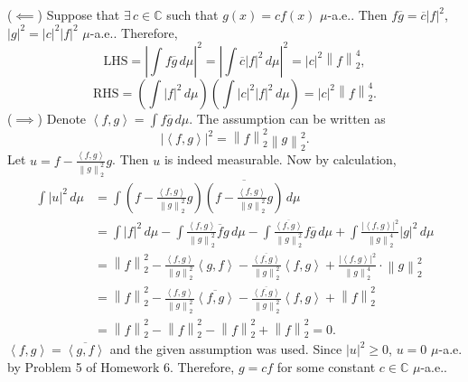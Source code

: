 \documentclass[12pt]{report}
\newcommand{\norm}[1]{\left\lVert #1 \right\rVert}
\newcommand{\abs}[1]{\left| #1 \right|}
\newcommand{\paren}[1]{\left( #1 \right)}
\renewcommand{\span}[1]{\left\langle #1 \right\rangle}
\newcommand{\mimp}{\(\implies\)}
\newcommand{\mimpd}{\(\impliedby\)}
\newcommand{\C}{\mathbb{C}}
\renewcommand{\d}[1]{\,d{#1}}
\let\oldexists\exists
\renewcommand{\exists}{\oldexists\,}
\begin{document}
\begin{enumerate}
    (\mimpd) Suppose that \(\exists c \in \C\) such that \(g(x) = cf(x)\) \(\mu\)-a.e.. Then \(f \overline{g} = \overline{c} \abs{f}^2\), \(\abs{g}^2 = \abs{c}^2 \abs{f}^2\) \(\mu\)-a.e.. Therefore,
    \[
        \text{LHS} = \abs{\int f\overline{g} \d{\mu}}^2 =\abs{\int \overline{c} \abs{f}^2 \d{\mu}}^2 = \abs{c}^2 \norm{f}_2^4,
    \]
    \[
        \text{RHS} = \paren{\int \abs{f}^2 \d{\mu}} \paren{\int \abs{c}^2 \abs{f}^2 \d{\mu}} = \abs{c}^2 \norm{f}_2^4.
    \]
    (\mimp) Denote \(\span{f, g} = \int f\overline{g} \d{\mu}\). The assumption can be written as
    \[
        \abs{\span{f, g}}^2 = \norm{f}_2^2 \norm{g}_2^2.
    \]
    Let \(u = f - \frac{\span{f, g}}{\norm{g}_2^2}g\). Then \(u\) is indeed measurable. Now by calculation,
    \[
        \begin{aligned}
            \int \abs{u}^2 \d{\mu} & = \int \paren{f - \frac{\span{f, g}}{\norm{g}_2^2}g} \overline{\paren{f - \frac{\span{f, g}}{\norm{g}_2^2}g}} \d{\mu}                                                                                                            \\
                                   & = \int \abs{f}^2 \d{\mu} - \int \frac{\span{f, g}}{\norm{g}_2^2} \overline{f} g \d{\mu} - \int \frac{\overline{\span{f, g}}}{\norm{g}_2^2}f\overline{g}\d{\mu} + \int \frac{\abs{\span{f, g}}^2}{\norm{g}_2^4} \abs{g}^2 \d{\mu} \\
                                   & = \norm{f}_2^2 - \frac{\span{f, g}}{\norm{g}_2^2} \span{g, f} - \frac{\overline{\span{f, g}}}{\norm{g}_2^2}\span{f, g} + \frac{\abs{\span{f, g}}^2}{\norm{g}_2^4} \cdot\norm{g}_2^2                                              \\
                                   & =\norm{f}_2^2 - \frac{\span{f, g}}{\norm{g}_2^2} \overline{\span{f, g}} - \frac{\overline{\span{f, g}}}{\norm{g}_2^2}\span{f, g} + \norm{f}_2^2                                                                                  \\
                                   & = \norm{f}_2^2 - \norm{f}_2^2 - \norm{f}_2^2 + \norm{f}_2^2 = 0.
        \end{aligned}
    \]
    \(\span{f, g} = \overline{\span{g, f}}\) and the given assumption was used. Since \(\abs{u}^2 \geq 0\), \(u = 0\) \(\mu\)-a.e. by {\sffamily Problem 5} of {\sffamily Homework 6}. Therefore, \(g = cf\) for some constant \(c \in \C\) \(\mu\)-a.e..
\end{enumerate}
\end{document}
